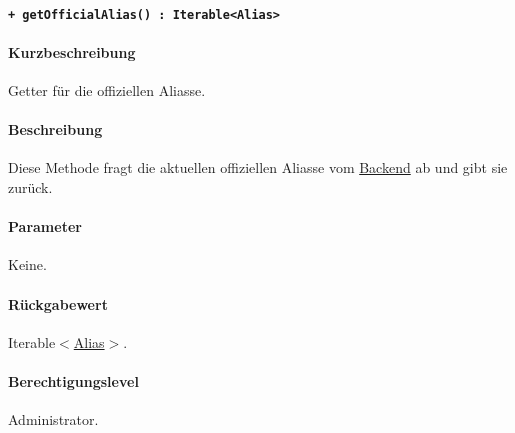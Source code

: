 \paragraph{\texttt{+ getOfficialAlias() : Iterable<Alias>}}\label{AP_Framework_getOfficialAlias}%
\paragraph*{Kurzbeschreibung}
Getter für die offiziellen Aliasse.
\paragraph*{Beschreibung}
Diese Methode fragt die aktuellen offiziellen Aliasse vom \hyperref[AP_Backend]{Backend} ab und gibt sie zurück.
\paragraph*{Parameter}
Keine.
\paragraph*{Rückgabewert}
Iterable$<$\hyperref[AP_Alias]{Alias}$>$.
\paragraph*{Berechtigungslevel}
Administrator.